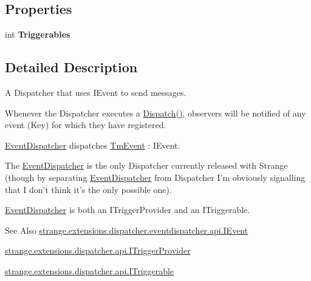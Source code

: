 \subsection*{Properties}
\begin{DoxyCompactItemize}
\item 
\hypertarget{classstrange_1_1extensions_1_1dispatcher_1_1eventdispatcher_1_1impl_1_1_event_dispatcher_acef4e2aa08821343fd6c516b0b71ed9f}{int {\bfseries Triggerables}}\label{classstrange_1_1extensions_1_1dispatcher_1_1eventdispatcher_1_1impl_1_1_event_dispatcher_acef4e2aa08821343fd6c516b0b71ed9f}

\end{DoxyCompactItemize}


\subsection{Detailed Description}
A Dispatcher that uses I\-Event to send messages. 

Whenever the Dispatcher executes a {\ttfamily \hyperlink{classstrange_1_1extensions_1_1dispatcher_1_1eventdispatcher_1_1impl_1_1_event_dispatcher_a70d8d7740798e10f960c866e03c4639b}{Dispatch()}}, observers will be notified of any event (Key) for which they have registered.

\hyperlink{classstrange_1_1extensions_1_1dispatcher_1_1eventdispatcher_1_1impl_1_1_event_dispatcher}{Event\-Dispatcher} dispatches \hyperlink{classstrange_1_1extensions_1_1dispatcher_1_1eventdispatcher_1_1impl_1_1_tm_event}{Tm\-Event} \-: I\-Event.

The \hyperlink{classstrange_1_1extensions_1_1dispatcher_1_1eventdispatcher_1_1impl_1_1_event_dispatcher}{Event\-Dispatcher} is the only Dispatcher currently released with Strange (though by separating \hyperlink{classstrange_1_1extensions_1_1dispatcher_1_1eventdispatcher_1_1impl_1_1_event_dispatcher}{Event\-Dispatcher} from Dispatcher I'm obviously signalling that I don't think it's the only possible one).

\hyperlink{classstrange_1_1extensions_1_1dispatcher_1_1eventdispatcher_1_1impl_1_1_event_dispatcher}{Event\-Dispatcher} is both an I\-Trigger\-Provider and an I\-Triggerable.

\begin{DoxySeeAlso}{See Also}
\hyperlink{interfacestrange_1_1extensions_1_1dispatcher_1_1eventdispatcher_1_1api_1_1_i_event}{strange.\-extensions.\-dispatcher.\-eventdispatcher.\-api.\-I\-Event} 

\hyperlink{interfacestrange_1_1extensions_1_1dispatcher_1_1api_1_1_i_trigger_provider}{strange.\-extensions.\-dispatcher.\-api.\-I\-Trigger\-Provider} 

\hyperlink{interfacestrange_1_1extensions_1_1dispatcher_1_1api_1_1_i_triggerable}{strange.\-extensions.\-dispatcher.\-api.\-I\-Triggerable} 
\end{DoxySeeAlso}


